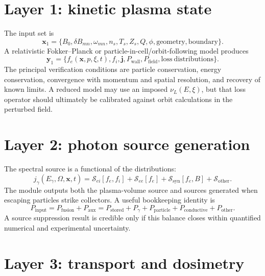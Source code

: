 \section{Layer 1: kinetic plasma state}

The input set is
\begin{equation}
\mathbf{x}_1=
\{B_0,\delta B_{mn},\omega_{mn},n_s,T_s,Z_s,Q,\phi,\mathrm{geometry},\mathrm{boundary}\}.
\end{equation}
A relativistic Fokker--Planck or particle-in-cell/orbit-following model produces
\begin{equation}
\mathbf{y}_1=
\{f_e(\mathbf{x},p,\xi,t),f_i,\mathbf{j},P_{\mathrm{wall}},P_{\mathrm{field}},\mathrm{loss\ distributions}\}.
\end{equation}
The principal verification conditions are particle conservation, energy conservation, convergence with momentum and spatial resolution, and recovery of known limits. A reduced model may use an imposed $\nu_L(E,\xi)$, but that loss operator should ultimately be calibrated against orbit calculations in the perturbed field.

\section{Layer 2: photon source generation}

The spectral source is a functional of the distributions:
\begin{equation}
 j_\gamma(E_\gamma,\Omega,\mathbf{x},t)
 =\mathcal{S}_{ei}[f_e,f_i]
 +\mathcal{S}_{ee}[f_e]
 +\mathcal{S}_{\mathrm{syn}}[f_e,B]
 +\mathcal{S}_{\mathrm{other}}.
\label{eq:source-functional}
\end{equation}
The module outputs both the plasma-volume source and sources generated when escaping particles strike collectors. A useful bookkeeping identity is
\begin{equation}
P_{\mathrm{input}}
=P_{\mathrm{fusion}}+P_{\mathrm{aux}}
=P_{\mathrm{stored}}^{\dot{}}
+P_{\gamma}
+P_{\mathrm{particle}}
+P_{\mathrm{conductive}}
+P_{\mathrm{other}}.
\label{eq:energy-balance}
\end{equation}
A source suppression result is credible only if this balance closes within quantified numerical and experimental uncertainty.

\section{Layer 3: transport and dosimetry}


